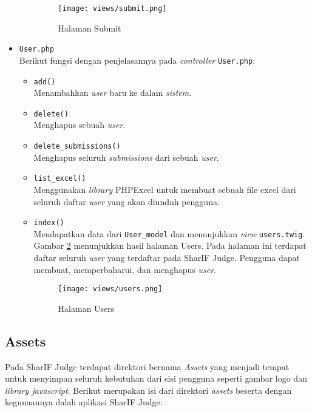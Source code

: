 \begin{itemize}
\begin{itemize}
		            \begin{figure}[H]
			            \centering
			            \texttt{[image: views/submit.png]}
			            \caption{Halaman Submit}
			            \label{fig:3:1:1:submit}
		            \end{figure}

	      \end{itemize}

	\item \verb|User.php| \\
	      Berikut fungsi dengan penjelasannya pada \textit{controller} \verb|User.php|:

	      \begin{itemize}
		      \item \verb|add()| \\
		            Menambahkan \textit{user} baru ke dalam \textit{sistem}.
		      \item \verb|delete()| \\
		            Menghapus sebuah \textit{user}.
		      \item \verb|delete_submissions()| \\
		            Menghapus seluruh \textit{submissions} dari sebuah \textit{user}.
		      \item \verb|list_excel()| \\
		            Menggunakan \textit{library} PHPExcel untuk membuat sebuah file excel dari seluruh daftar \textit{user} yang akan diunduh pengguna.
		      \item \verb|index()| \\
		            Mendapatkan data dari \verb|User_model| dan menunjukkan \textit{view} \verb|users.twig|. Gambar \ref{fig:3:1:1:users} menunjukkan hasil halaman Users. Pada halaman ini terdapat daftar seluruh \textit{user} yang terdaftar pada SharIF Judge. Pengguna dapat membuat, memperbaharui, dan menghapus \textit{user}.

		            \begin{figure}[H]
			            \centering
			            \texttt{[image: views/users.png]}
			            \caption{Halaman Users}
			            \label{fig:3:1:1:users}
		            \end{figure}


	      \end{itemize}

\end{itemize}

\subsection{Assets}
Pada SharIF Judge terdapat direktori bernama \textit{Assets} yang menjadi tempat untuk menyimpan seluruh kebutuhan dari sisi pengguna seperti gambar logo dan \textit{library javascript}. Berikut merupakan isi dari direktori \textit{assets} beserta dengan kegunaannya dalah aplikasi SharIF Judge:

